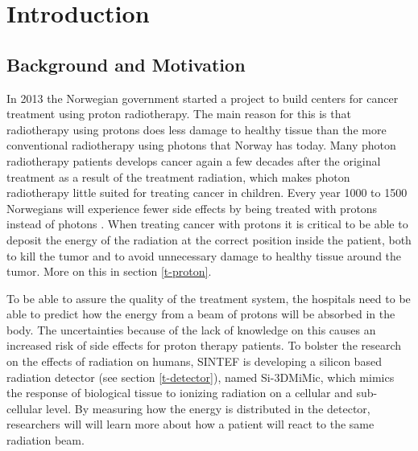 \documentclass[../main/thesis.tex]{subfiles}
\begin{document}
\newpage

\chapter{Introduction}
\label{intro}
\section{Background and Motivation}
\label{i-background}
In 2013 the Norwegian government started a project to build centers for cancer treatment using proton radiotherapy. The main reason for this is that radiotherapy using protons does less damage to healthy tissue than the more conventional radiotherapy using photons that Norway has today. Many photon radiotherapy patients develops cancer again a few decades after the original treatment as a result of the treatment radiation, which makes photon radiotherapy little suited for treating cancer in children. Every year 1000 to 1500 Norwegians will experience fewer side effects by being treated with protons instead of photons \citep{uio2012}. When treating cancer with protons it is critical to be able to deposit the energy of the radiation at the correct position inside the patient, both to kill the tumor and to avoid unnecessary damage to healthy tissue around the tumor. More on this in section \ref{t-proton}.


To be able to assure the quality of the treatment system, the hospitals need to be able to predict how the energy from a beam of protons will be absorbed in the body. The uncertainties because of the lack of knowledge on this causes an increased risk of side effects for proton therapy patients. To bolster the research on the effects of radiation on humans, SINTEF is developing a silicon based radiation detector (see section \ref{t-detector}), named Si-3DMiMic, which mimics the response of biological tissue to ionizing radiation on a cellular and sub-cellular level. By measuring how the energy is distributed in the detector, researchers will will learn more about how a patient will react to the same radiation beam. \citep{sintef3dmimic}
\end{document}
